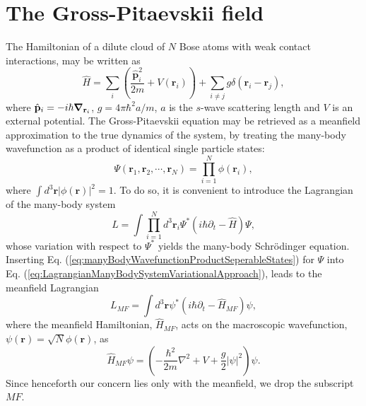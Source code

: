 \documentclass[twocolumn, nofootinbib, nobibnotes, amsmath,amssymb,aps, pra, floatfix]{revtex4-1}
\renewcommand{\v}[1]{\ensuremath{\mathbf{#1}}} %
\newcommand{\gv}[1]{\ensuremath{\mbox{\boldmath$ #1 $}}} %
\newcommand{\abs}[1]{\left| #1 \right|} %
\newcommand{\grad}[1]{\gv{\nabla} #1} %
\begin{document}
\section{The Gross-Pitaevskii field}
The Hamiltonian of a dilute cloud of $N$ Bose atoms with weak contact interactions, may be written as
\begin{equation}
  \hat{H}=\sum_{i}\left( \frac{\hat{\v{p}}_i^2}{2m}+V\left( \v{r}_i \right) \right)+\sum_{i\neq j}g\delta\left( \v{r}_i-\v{r}_j \right),
  \label{eq:HamiltonianGPMicroscopic}
\end{equation}
where $\hat{\v{p}}_i=-i\hbar\grad{}_{\v{r}_i}$, $g=4\pi\hbar^2a/m$, $a$ is the $s$-wave scattering length and $V$ is an external potential.
The Gross-Pitaevskii equation may be retrieved as a meanfield approximation to the true dynamics of the system, by treating the many-body wavefunction as a product of identical single particle states:
\begin{equation}
  \Psi\left( \v{r}_1,\v{r}_2,\cdots,\v{r}_N \right)=\prod_{i=1}^N\phi\left( \v{r}_i \right),
  \label{eq:manyBodyWavefunctionProductSeperableStates}
\end{equation}
where $\int d^3\v{r}\abs{\phi\left( \v{r} \right)}^2 = 1$.
To do so, it is convenient to introduce the Lagrangian of the many-body system \cite{frenkel1934wave,dirac1981principles,schiff1968quantum,gray2004progress,deumens1994time}
\begin{equation}
  L=\int \prod_{i=1}^Nd^3\v{r}_i\Psi^*\left( i\hbar\partial_t-\hat{H} \right)\Psi,
  \label{eq:LagrangianManyBodySystemVariationalApproach}
\end{equation}
whose variation with respect to $\Psi^*$ yields the many-body Schr\"odinger equation.
Inserting Eq. (\ref{eq:manyBodyWavefunctionProductSeperableStates}) for $\Psi$ into Eq. (\ref{eq:LagrangianManyBodySystemVariationalApproach}), leads to the meanfield Lagrangian
\begin{equation}
  L_{MF}=\int d^3\v{r}\psi^*\left( i\hbar\partial_t-\hat{H}_{MF} \right)\psi,
  \label{eq:meanfieldLagrangianGPfield}
\end{equation}
where the meanfield Hamiltonian, $\hat{H}_{MF}$, acts on the macroscopic wavefunction, $\psi\left( \v{r} \right)=\sqrt{N}\phi\left( \v{r} \right)$, as
\begin{equation}
  \hat{H}_{MF}\psi=\left(-\frac{\hbar^2}{2m}\nabla^2+V+\frac{g}{2}\abs{\psi}^2\right)\psi.
  \label{eq:meanfieldHamiltonianGPfieldActionOnWavefunction}
\end{equation}
Since henceforth our concern lies only with the meanfield, we drop the subscript $MF$.
\end{document}
